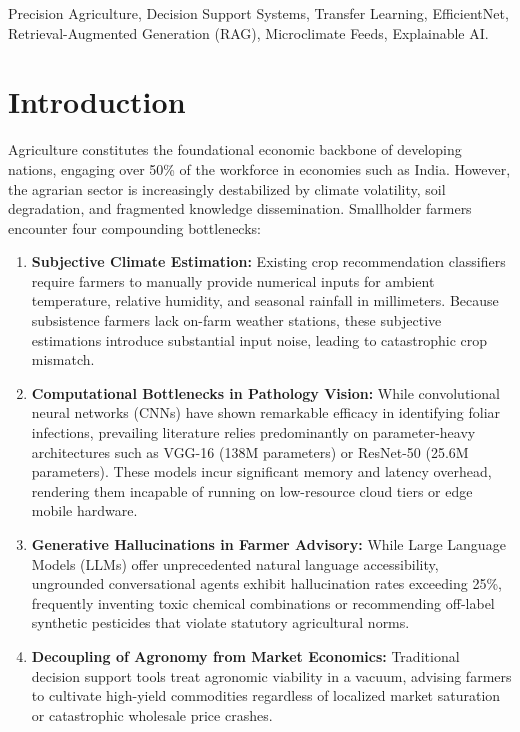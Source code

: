 \documentclass[conference]{IEEEtran}
\begin{document}
\begin{IEEEkeywords}
Precision Agriculture, Decision Support Systems, Transfer Learning, EfficientNet, Retrieval-Augmented Generation (RAG), Microclimate Feeds, Explainable AI.
\end{IEEEkeywords}

\section{Introduction}
Agriculture constitutes the foundational economic backbone of developing nations, engaging over 50\% of the workforce in economies such as India. However, the agrarian sector is increasingly destabilized by climate volatility, soil degradation, and fragmented knowledge dissemination. Smallholder farmers encounter four compounding bottlenecks:
\begin{enumerate}
    \item \textbf{Subjective Climate Estimation:} Existing crop recommendation classifiers require farmers to manually provide numerical inputs for ambient temperature, relative humidity, and seasonal rainfall in millimeters. Because subsistence farmers lack on-farm weather stations, these subjective estimations introduce substantial input noise, leading to catastrophic crop mismatch.
    \item \textbf{Computational Bottlenecks in Pathology Vision:} While convolutional neural networks (CNNs) have shown remarkable efficacy in identifying foliar infections, prevailing literature relies predominantly on parameter-heavy architectures such as VGG-16 (138M parameters) or ResNet-50 (25.6M parameters). These models incur significant memory and latency overhead, rendering them incapable of running on low-resource cloud tiers or edge mobile hardware.
    \item \textbf{Generative Hallucinations in Farmer Advisory:} While Large Language Models (LLMs) offer unprecedented natural language accessibility, ungrounded conversational agents exhibit hallucination rates exceeding 25\%, frequently inventing toxic chemical combinations or recommending off-label synthetic pesticides that violate statutory agricultural norms.
    \item \textbf{Decoupling of Agronomy from Market Economics:} Traditional decision support tools treat agronomic viability in a vacuum, advising farmers to cultivate high-yield commodities regardless of localized market saturation or catastrophic wholesale price crashes.
\end{enumerate}
\end{document}
